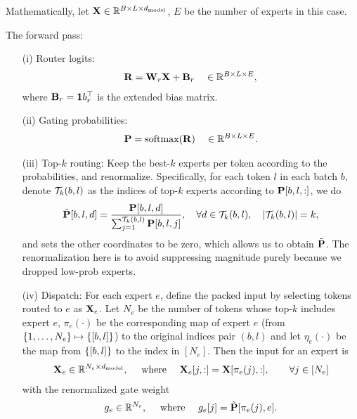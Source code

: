 \documentclass[11pt]{article}  %
\begin{document}
Mathematically, let $\mathbf{X} \in \mathbb{R}^{B \times L \times d_{\text{model}}}$, $E$ be the number of experts in this case. 

The forward pass:

\begin{itemize}
  \item[(i)] Router logits:
  \begin{align*}
    \mathbf{R} = \mathbf{W}_r \mathbf{X} + \mathbf{B}_r \quad \in \mathbb{R}^{B \times L \times E},
  \end{align*}
  where $\mathbf{B}_r = \mathbf{1}b_r^{\top}$ is the extended bias matrix. 
  \item[(ii)] Gating probabilities:
  \begin{align*}
    \mathbf{P} = \text{softmax} (\mathbf{R}) \quad \in \mathbb{R}^{B \times L \times E}.
  \end{align*}

  \item[(iii)] Top-$k$ routing: 
  Keep the best-$k$ experts per token according to the probabilities, and renormalize.
  Specifically, for each token $l$ in each batch $b$, denote $\mathcal{T}_k(b, l)$ as the indices of top-$k$ experts according to $\mathbf{P}[b, l, :]$, we do 
  \begin{align*}
    \tilde{\mathbf{P}}[b, l, d] = \frac{\mathbf{P}[b, l, d]}{\sum_{j=1}^{\mathcal{T}_k(b, l)}\mathbf{P}[b, l, j]},\quad \forall d \in \mathcal{T}_k(b, l), \quad \lvert \mathcal{T}_k(b, l) \rvert = k,
  \end{align*} 
  and sets the other coordinates to be zero, which allows us to obtain $\tilde{\mathbf{P}}$.
  The renormalization here is to avoid suppressing magnitude purely because we dropped low-prob experts.

  \item[(iv)] Dispatch:
  For each expert $e$, define the packed input by selecting tokens routed to $e$ as $\mathbf{X}_e$.
  Let $N_e$ be the number of tokens whose top-$k$ includes expert $e$, $\pi_e(\cdot)$ be the corresponding map of expert $e$ (from $\left\{ 1, \dots, N_e \right\} \mapsto \left\{ [b, l] \right\}$) to the original indices pair $(b, l)$ and let $\eta_e(\cdot)$ be the map from $\left\{ [b, l] \right\}$ to the index in $[N_e]$.
  Then the input for an expert is 
  \begin{align*}
    \mathbf{X}_e \in \mathbb{R}^{N_e \times d_{\text{model}}}, \quad \text{    where    }\quad \mathbf{X}_e[j, :] = \mathbf{X}[\pi_e(j), :], \qquad \forall j \in [N_e]
  \end{align*}
  with the renormalized gate weight 
  \begin{align*}
    g_e \in \mathbb{R}^{N_e}, \quad \text{    where    }\quad g_e[j] = \tilde{\mathbf{P}}[\pi_e(j), e].
  \end{align*}


\end{itemize}
\end{document}

